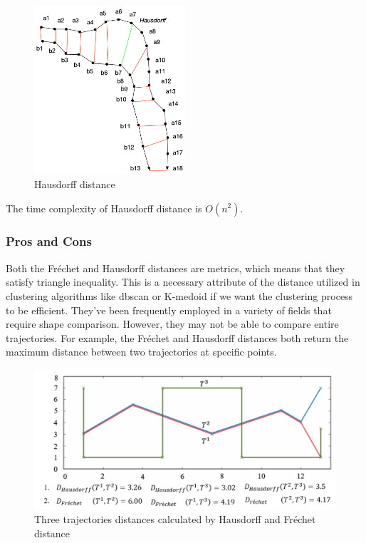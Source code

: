 \documentclass[a4paper, 12pt]{article}
\begin{document}
\begin{figure}[ht]
    \centering
    \includegraphics[width=0.5\textwidth]{Hausdorff.png}
    \caption{Hausdorff distance}
\end{figure}

The time complexity of Hausdorff distance is $O(n^2)$. 

\subsubsection{Pros and Cons}
Both the Fréchet and Hausdorff distances are metrics, which means that they satisfy triangle inequality.
This is a necessary attribute of the distance utilized in clustering algorithms like dbscan or K-medoid if we want the clustering process to be efficient.
They've been frequently employed in a variety of fields that require shape comparison.
However, they may not be able to compare entire trajectories. For example, the Fréchet and Hausdorff distances both return the maximum distance between two trajectories at specific points.

\begin{figure}[ht]
    \centering
    \includegraphics[width=1\textwidth]{hausdorff_frechet_distance.png}
    \caption{Three trajectories distances calculated by Hausdorff and Fréchet distance \citep{besse2015review}}
    \label{fig10}
\end{figure}
\end{document}
